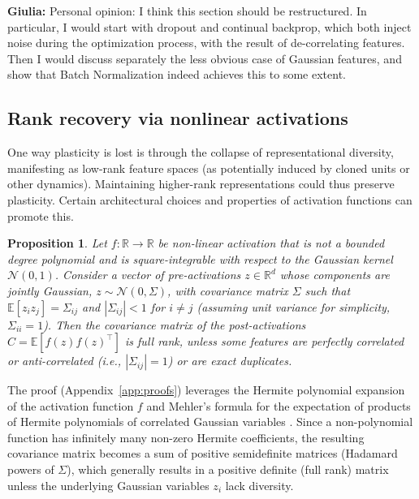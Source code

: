 \documentclass{article}
\newcommand{\R}{\mathbb{R}}
\newcommand{\E}{\mathbb{E}}
\newcommand{\giulia}[1]{{\color{ForestGreen}\textbf{Giulia:} #1}}
\newtheorem{proposition}{Proposition}[section]
\begin{document}
\giulia{Personal opinion: I think this section should be restructured. In particular, I would start with dropout and continual backprop, which both inject noise during the optimization process, with the result of de-correlating features. Then I would discuss separately the less obvious case of Gaussian features, and show that Batch Normalization indeed achieves this to some extent.}

\subsection{Rank recovery via nonlinear activations}

One way plasticity is lost is through the collapse of representational diversity, manifesting as low-rank feature spaces (as potentially induced by cloned units or other dynamics). Maintaining higher-rank representations could thus preserve plasticity. Certain architectural choices and properties of activation functions can promote this.

\begin{proposition}
\label{prop:rank}
Let $f:\R\to\R$ be non-linear activation that is not a bounded degree polynomial and is square-integrable with respect to the Gaussian kernel $\mathcal{N}(0,1)$. Consider a vector of pre-activations $z\in\R^d$ whose components are jointly Gaussian, $z \sim \mathcal{N}(0, \Sigma)$, with covariance matrix $\Sigma$ such that $\E[z_i z_j]=\Sigma_{ij}$ and $|\Sigma_{ij}|<1$ for $i \neq j$ (assuming unit variance for simplicity, $\Sigma_{ii}=1$). Then the covariance matrix of the post-activations $C = \E[f(z)f(z)^\top]$ is full rank, unless some features are perfectly correlated or anti-correlated (i.e., $|\Sigma_{ij}|=1$) or are exact duplicates.
\end{proposition}

The proof (Appendix~\ref{app:proofs}) leverages the Hermite polynomial expansion of the activation function $f$ \cite{erdelyi1953higher} and Mehler's formula for the expectation of products of Hermite polynomials of correlated Gaussian variables \cite{mehler1866ueber, erdelyi1953higher}. Since a non-polynomial function has infinitely many non-zero Hermite coefficients, the resulting covariance matrix becomes a sum of positive semidefinite matrices (Hadamard powers of $\Sigma$), which generally results in a positive definite (full rank) matrix unless the underlying Gaussian variables $z_i$ lack diversity.

\end{document}
